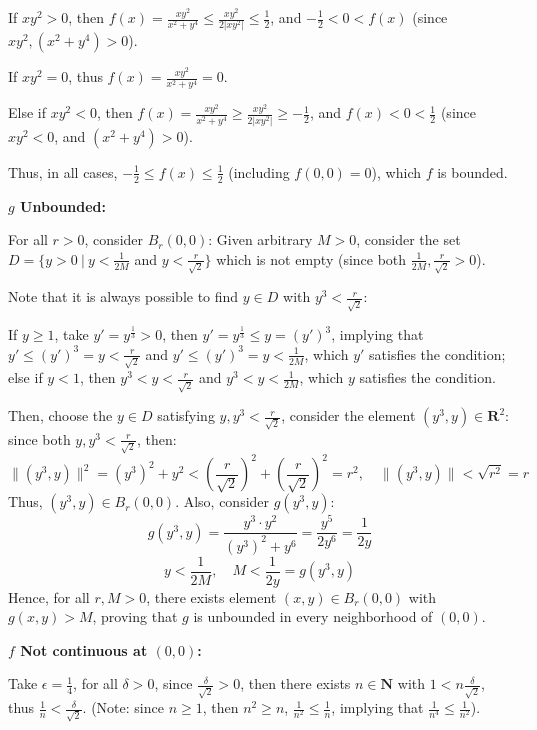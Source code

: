 \documentclass{article}
\begin{document}
\begin{itemize}
    If $xy^2 > 0$, then $f(x)=\frac{xy^2}{x^2+y^4} \leq \frac{xy^2}{2|xy^2|} \leq \frac{1}{2}$, and $-\frac{1}{2}<0 < f(x)$ (since $xy^2, (x^2+y^4) >0$).

    If $xy^2=0$, thus $f(x)=\frac{xy^2}{x^2+y^4} = 0$.

    Else if $xy^2 <0$, then $f(x) = \frac{xy^2}{x^2+y^4} \geq \frac{xy^2}{2|xy^2|} \geq -\frac{1}{2}$, and $f(x) <0 < \frac{1}{2}$ (since $xy^2<0$, and $(x^2+y^4)>0$).

    Thus, in all cases, $-\frac{1}{2} \leq f(x) \leq \frac{1}{2}$ (including $f(0,0)=0$), which $f$ is bounded.

    \hfill

    \textbf{$g$ Unbounded:}

    For all $r>0$, consider $B_r(0,0)$: Given arbitrary $M>0$, consider the set $D = \{y>0\ |\ y<\frac{1}{2M}$ and $y < \frac{r}{\sqrt{2}}\}$ which is not empty (since both $\frac{1}{2M},\frac{r}{\sqrt{2}} >0$).

    Note that it is always possible to find $y\in D$ with $y^3 < \frac{r}{\sqrt{2}}$:
    
    If $y\geq 1$, take $y'=y^{\frac{1}{3}} >0$, then $y'=y^\frac{1}{3} \leq y = (y')^3$, implying that $y' \leq (y')^3 =y < \frac{r}{\sqrt{2}}$ and $y' \leq (y')^3 =y < \frac{1}{2M}$, which $y'$ satisfies the condition; else if $y<1$, then $y^3 < y < \frac{r}{\sqrt{2}}$ and $y^3 < y < \frac{1}{2M}$, which $y$ satisfies the condition.

    Then, choose the $y\in D$ satisfying $y,y^3 < \frac{r}{\sqrt{2}}$, consider the element $(y^3,y)\in\mathbf{R}^2$: since both $y,y^3 < \frac{r}{\sqrt{2}}$, then:
    $$\|(y^3,y)\|^2 = (y^3)^2 + y^2 < (\frac{r}{\sqrt{2}})^2+(\frac{r}{\sqrt{2}})^2=r^2,\quad \|(y^3,y)\| < \sqrt{r^2}=r$$
    Thus, $(y^3,y)\in B_r(0,0)$. Also, consider $g(y^3,y)$:
    $$g(y^3,y) = \frac{y^3 \cdot y^2}{(y^3)^2+y^6} = \frac{y^5}{2y^6} = \frac{1}{2y}$$
    $$y < \frac{1}{2M},\quad M < \frac{1}{2y} = g(y^3,y)$$
    Hence, for all $r,M>0$, there exists element $(x,y)\in B_r(0,0)$ with $g(x,y) > M$, proving that $g$ is unbounded in every neighborhood of $(0,0)$.

    \hfill

    \textbf{$f$ Not continuous at $(0,0)$:}

    Take $\epsilon=\frac{1}{4}$, for all $\delta >0$, since $\frac{\delta}{\sqrt{2}}>0$, then there exists $n\in\mathbf{N}$ with $1 < n\frac{\delta}{\sqrt{2}}$, thus $\frac{1}{n}<\frac{\delta}{\sqrt{2}}$.
    (Note: since $n\geq 1$, then $n^2\geq n$, $\frac{1}{n^2}\leq \frac{1}{n}$, implying that $\frac{1}{n^4} \leq \frac{1}{n^2}$).


\end{itemize}
\end{document}
